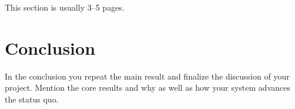 \documentclass[a4paper,11pt,oneside]{report}
\begin{document}
This section is usually 3–5 pages.


\chapter{Conclusion}

In the conclusion you repeat the main result and finalize the discussion of
your project. Mention the core results and why as well as how your system
advances the status quo.

\cleardoublepage{}
\printbibliography{}

%
%
\end{document}
